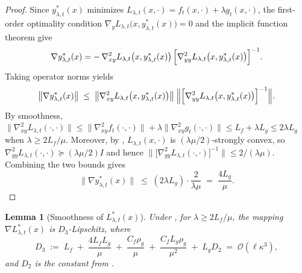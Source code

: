 \documentclass{uai2026} %
\newtheorem{lemma}{Lemma}[section]
\begin{document}
\begin{proof}
Since $y^*_{\lambda,t}(x)$ minimizes $L_{\lambda,t}(x,\cdot)=f_{t}(x,\cdot)+\lambda g_{t}(x,\cdot)$, the
first-order optimality condition $\nabla_y L_{\lambda,t}\bigl(x,y^*_{\lambda,t}(x)\bigr)=0$
and the implicit function theorem give
\[
\nabla y^*_{\lambda,t}(x)
= -\,\nabla^2_{xy} L_{\lambda,t}\bigl(x,y^*_{\lambda,t}(x)\bigr)\,
\Bigl[\nabla^2_{yy} L_{\lambda,t}\bigl(x,y^*_{\lambda,t}(x)\bigr)\Bigr]^{-1}.
\]
Taking operator norms yields
\[
\bigl\|\nabla y^*_{\lambda,t}(x)\bigr\|
\;\le\; \bigl\|\nabla^2_{xy} L_{\lambda,t}\bigl(x,y^*_{\lambda,t}(x)\bigr)\bigr\|\;
\Bigl\|\Bigl[\nabla^2_{yy} L_{\lambda,t}\bigl(x,y^*_{\lambda,t}(x)\bigr)\Bigr]^{-1}\Bigr\|.
\]
By smoothness, $\|\nabla^2_{xy} L_{\lambda,t}(\cdot,\cdot)\|
\le \|\nabla^2_{xy} f_{t}(\cdot,\cdot)\|+\lambda\|\nabla^2_{xy} g_{t}(\cdot,\cdot)\|
\le L_f+\lambda L_g \le 2\lambda L_g$ when $\lambda \ge 2L_f/\mu$.
Moreover, by , $L_{\lambda,t}(x,\cdot)$ is $(\lambda\mu/2)$-strongly convex, so
$\nabla^2_{yy} L_{\lambda,t}(\cdot,\cdot) \succeq (\lambda\mu/2)I$ and hence
$\bigl\|\bigl[\nabla^2_{yy} L_{\lambda,t}(\cdot,\cdot)\bigr]^{-1}\bigr\| \le 2/(\lambda\mu)$.
Combining the two bounds gives
\[
\bigl\|\nabla y^*_{\lambda,t}(x)\bigr\| \;\le\; (2\lambda L_g)\cdot\frac{2}{\lambda\mu}
\;=\; \frac{4L_g}{\mu}.
\]
\end{proof}

\begin{lemma}[Smoothness of $L^*_{\lambda,t}(x)$]
\label{lem:B7}
Under , for $\lambda \ge 2L_f/\mu$, the mapping $\nabla L^*_{\lambda,t}(x)$ is $D_3$-Lipschitz, where
\[
D_3 \;:=\; L_f \;+\; \frac{4L_fL_g}{\mu} \;+\; \frac{C_f\rho_g}{\mu} \;+\; \frac{C_f L_g \rho_g}{\mu^2} \;+\; L_g D_2
\;=\; \mathcal{O}(\ell\kappa^3),
\]
and $D_2$ is the constant from .
\end{lemma}
\end{document}
